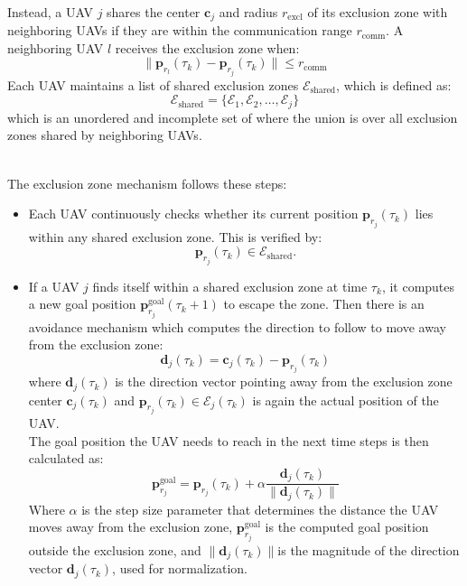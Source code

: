 \documentclass[main]{subfiles}
\begin{document}
\noindent\\
Instead, a UAV \( j \) shares the center \( \mathbf{c}_j \) and radius 
\( r_{\text{excl}} \) of its exclusion zone with neighboring UAVs 
if they are within the communication range \( r_{\text{comm}} \). 
A neighboring UAV \( l \) receives the exclusion zone when:
\begin{equation}
\|\mathbf{p}_{r_l}(\tau_k) - \mathbf{p}_{r_j}(\tau_k)\| \leq r_{\text{comm}}
\label{eq:in_comm}
\end{equation}
Each UAV maintains a list of shared exclusion zones 
\( \mathcal{E}_\text{shared} \), which is defined as:
\[
\mathcal{E}_\text{shared} = \{\mathcal{E}_1, \mathcal{E}_2, \dots, \mathcal{E}_j\}
\]
which is an unordered and incomplete set of 
where the union is over all exclusion zones shared by neighboring UAVs.

\noindent\\
The exclusion zone mechanism follows these steps:
\begin{itemize}
    \item Each UAV continuously checks whether its current position 
    \( \mathbf{p}_{r_j}(\tau_k) \) lies within any shared exclusion zone. 
    This is verified by:
    \[
    \mathbf{p}_{r_j}(\tau_k) \in \mathcal{E}_\text{shared}.
    \]
    \item If a UAV \( j \) finds itself within a shared exclusion zone at time \( \tau_k \), 
    it computes a new goal position \( \mathbf{p}_{r_j}^{\text{goal}}(\tau_k + 1) \) 
    to escape the zone. Then there is an avoidance mechanism which
    computes the direction to follow to move away from the exclusion zone:
    \[
    \mathbf{d}_j(\tau_k) = \mathbf{c}_j(\tau_k) - \mathbf{p}_{r_j}(\tau_k)
    \]
    where \( \mathbf{d}_j(\tau_k) \) is the direction vector pointing away 
    from the exclusion zone center \( \mathbf{c}_j(\tau_k) \) and 
    \( \mathbf{p}_{r_j}(\tau_k) \in \mathcal{E}_j(\tau_k) \) is again the actual
    position of the UAV.
    \noindent\\
    The goal position the UAV needs to reach in the next time steps is then calculated as:
    \begin{equation}
        \mathbf{p}_{r_j}^{\text{goal}} = \mathbf{p}_{r_j}(\tau_k) 
        + \alpha \frac{\mathbf{d}_j(\tau_k)}{\|\mathbf{d}_j(\tau_k)\|}
        \label{eq:move_away}
    \end{equation}
    Where \( \alpha \) is the step size parameter that determines 
        the distance the UAV moves away from the exclusion zone,
         \( \mathbf{p}_{r_j}^{\text{goal}} \) is the computed 
        goal position outside the exclusion zone, and
        \( \|\mathbf{d}_j(\tau_k)\| \)is the magnitude of the direction 
        vector \( \mathbf{d}_j(\tau_k) \), used for normalization.
\end{itemize}
\end{document}
